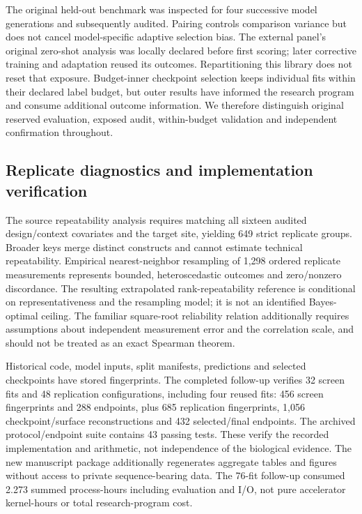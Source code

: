 The original held-out benchmark was inspected for four successive model generations and subsequently audited. Pairing controls comparison variance but does not cancel model-specific adaptive selection bias. The external panel's original zero-shot analysis was locally declared before first scoring; later corrective training and adaptation reused its outcomes. Repartitioning this library does not reset that exposure. Budget-inner checkpoint selection keeps individual fits within their declared label budget, but outer results have informed the research program and consume additional outcome information. We therefore distinguish original reserved evaluation, exposed audit, within-budget validation and independent confirmation throughout.

\subsection{Replicate diagnostics and implementation verification}
The source repeatability analysis requires matching all sixteen audited design/context covariates and the target site, yielding 649 strict replicate groups. Broader keys merge distinct constructs and cannot estimate technical repeatability. Empirical nearest-neighbor resampling of 1,298 ordered replicate measurements represents bounded, heteroscedastic outcomes and zero/nonzero discordance. The resulting extrapolated rank-repeatability reference is conditional on representativeness and the resampling model; it is not an identified Bayes-optimal ceiling. The familiar square-root reliability relation additionally requires assumptions about independent measurement error and the correlation scale, and should not be treated as an exact Spearman theorem.

Historical code, model inputs, split manifests, predictions and selected checkpoints have stored fingerprints. The completed follow-up verifies 32 screen fits and 48 replication configurations, including four reused fits: 456 screen fingerprints and 288 endpoints, plus 685 replication fingerprints, 1,056 checkpoint/surface reconstructions and 432 selected/final endpoints. The archived protocol/endpoint suite contains 43 passing tests. These verify the recorded implementation and arithmetic, not independence of the biological evidence. The new manuscript package additionally regenerates aggregate tables and figures without access to private sequence-bearing data. The 76-fit follow-up consumed 2.273 summed process-hours including evaluation and I/O, not pure accelerator kernel-hours or total research-program cost.
